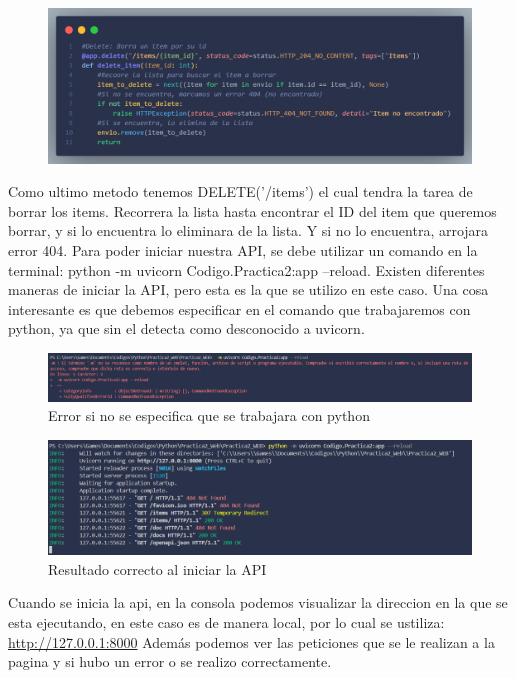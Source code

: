 \documentclass[12pt]{article}
\begin{document}
\begin{figure}[H]
    \centering
    \includegraphics[width=1\textwidth]{Imagenes/Captura10_patch.png}    
\end{figure}
Como ultimo metodo tenemos DELETE('/items') el cual tendra la tarea de borrar los items.
Recorrera la lista hasta encontrar el ID del item que queremos borrar, y si lo encuentra lo eliminara de la lista.
Y si no lo encuentra, arrojara error 404.
Para poder iniciar nuestra API, se debe utilizar un comando en la terminal: python -m uvicorn Codigo.Practica2:app --reload.
Existen diferentes maneras de iniciar la API, pero esta es la que se utilizo en este caso.
Una cosa interesante es que debemos especificar en el comando que trabajaremos con python, ya que sin el detecta como desconocido a uvicorn.
\begin{figure}[H]
    \centering
    \includegraphics[width=1\textwidth]{Imagenes/Captura_consola2.png}
    \caption{Error si no se especifica que se trabajara con python}
\end{figure}

\begin{figure}[H]
    \centering
    \includegraphics[width=1\textwidth]{Imagenes/Captura_consola1.png}
    \caption{Resultado correcto al iniciar la API}
\end{figure}
Cuando se inicia la api, en la consola podemos visualizar la direccion en la que se esta ejecutando, en este caso es de manera local, por lo cual se ustiliza: \url{http://127.0.0.1:8000}
Además podemos ver las peticiones que se le realizan a la pagina y si hubo un error o se realizo correctamente.
\end{document}

